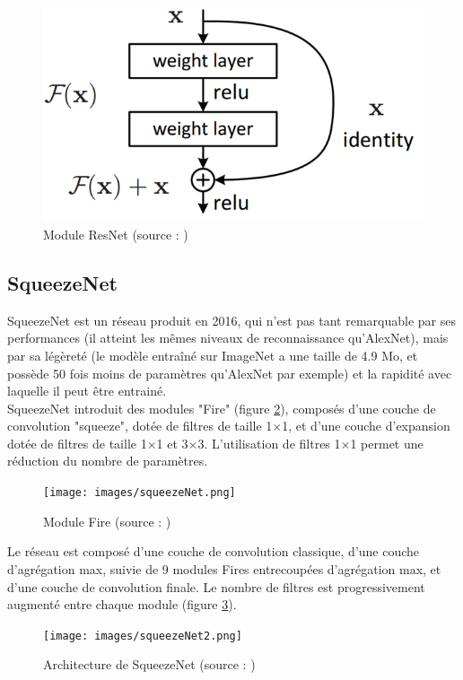 \documentclass{DocBleu}
\begin{document}
\begin{figure}[hbtp!]
\centering
\includegraphics[scale=.37]{images/resNet.png}
\caption{Module ResNet (source : \cite{He15})}
\label{F:ResNet}
\end{figure}

\subsection{SqueezeNet}
SqueezeNet \cite{Iandola16} est un réseau produit en 2016, qui n'est pas tant remarquable par ses performances (il atteint les mêmes niveaux de reconnaissance qu'AlexNet), mais par sa légèreté (le modèle entraîné sur ImageNet a une taille de 4.9 Mo, et possède 50 fois moins de paramètres qu'AlexNet par exemple) et la rapidité avec laquelle il peut être entrainé. \\
SqueezeNet  introduit des modules "Fire" (figure \ref{F:SqueezeNet}), composés d'une couche de convolution "squeeze", dotée de filtres de taille 1$\times$1, et d'une couche d'expansion dotée de filtres de taille 1$\times$1 et 3$\times$3. L'utilisation de filtres 1$\times$1 permet une réduction du nombre de paramètres.  
\begin{figure}[hbtp!]
\centering
\texttt{[image: images/squeezeNet.png]}
\caption{Module Fire (source : \cite{Iandola16})}
\label{F:SqueezeNet}
\end{figure}

Le réseau est composé d'une couche de convolution classique, d'une couche d'agrégation max, suivie de 9 modules Fires entrecoupées d'agrégation max, et d'une couche de convolution finale. Le nombre de filtres est progressivement augmenté entre chaque module (figure \ref{F:SqueezeNet2}).

\begin{figure}[hbtp!]
\centering
\texttt{[image: images/squeezeNet2.png]}
\caption{Architecture de SqueezeNet (source :  \cite{Iandola16})}
\label{F:SqueezeNet2}
\end{figure}
\end{document}
